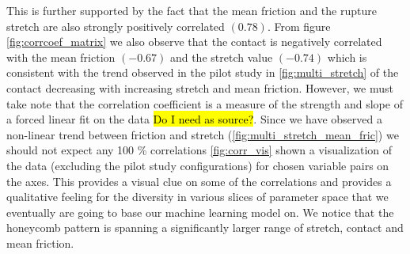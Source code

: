 This is further supported by the fact that the mean friction and the rupture
stretch are also strongly positively correlated $(0.78)$. From figure
\cref{fig:corrcoef_matrix} we also observe that the contact is negatively
correlated with the mean friction $(-0.67)$ and the stretch value $(-0.74)$
which is consistent with the trend observed in the pilot study in
\cref{fig:multi_stretch} of the contact decreasing with increasing stretch and
mean friction. However, we must take note that the correlation coefficient is a
measure of the strength and slope of a forced linear fit on the data \hl{Do I
need as source?}. Since we have observed a non-linear trend between friction and
stretch (\cref{fig:multi_stretch_mean_fric}) we should not expect any 100 \%
correlations \cref{fig:corr_vis} shown a visualization of the data (excluding
the pilot study configurations) for chosen variable pairs on the axes. This
provides a visual clue on some of the correlations and provides a qualitative
feeling for the diversity in various slices of parameter space that we
eventually are going to base our machine learning model on. We notice that the
honeycomb pattern is spanning a significantly larger range of stretch, contact
and mean friction.

